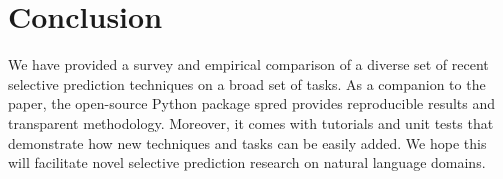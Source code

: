 \documentclass[11pt]{article}
\begin{document}
\section{Conclusion}

We have provided a survey and empirical comparison of a diverse set of recent selective prediction techniques on a broad set of tasks. As a companion to the paper, the open-source Python package \textsf{spred} provides reproducible results and transparent methodology. Moreover, it comes with tutorials and unit tests that demonstrate how new techniques and tasks can be easily added. We hope this will facilitate novel selective prediction research on natural language domains.











\end{document}
